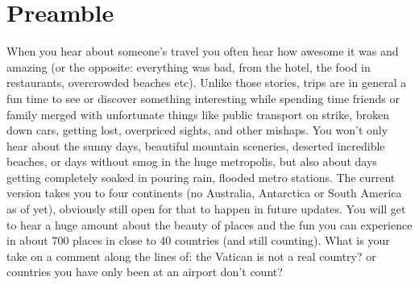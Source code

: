 \chapter{Preamble}

When you hear about someone's travel you often hear how awesome it was and amazing (or the opposite: everything was bad, from the hotel, the food in restaurants, overcrowded beaches etc). Unlike those stories, trips are in general a fun time to see or discover something interesting while spending time friends or family merged with unfortunate things like public transport on strike, broken down cars, getting lost, overpriced sights, and other mishaps. You won't only hear about the sunny days, beautiful mountain sceneries, deserted incredible beaches, or days without smog in the huge metropolis, but also about days getting completely soaked in pouring rain, flooded metro stations. The current version takes you to four continents (no Australia, Antarctica or South America as of yet), obviously still open for that to happen in future updates. You will get to hear a huge amount about the beauty of places and the fun you can experience in about 700 places in close to 40 countries (and still counting). What is your take on a comment along the lines of: the Vatican is not a real country? or countries you have only been at an airport don't count?
